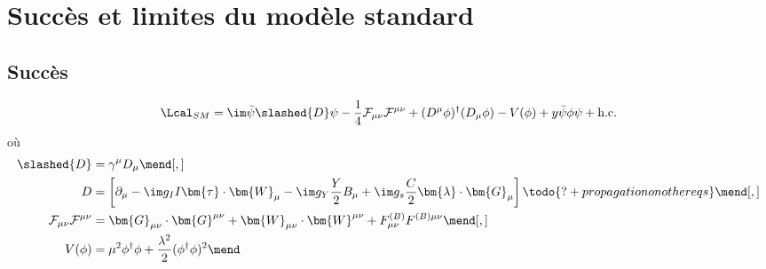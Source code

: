 \section{Succès et limites du modèle standard}\label{chapter-MS-MSSM-section-succes_limites}
\subsection{Succès}\label{chapter-MS-MSSM-section-succes_limites-subsec-succes}

\begin{equation}
\Lcal_{SM} = 
\im \bar{\psi} \slashed{D} \psi
- \frac{1}{4} \mathcal{F}_{\mu\nu}\mathcal{F}^{\mu\nu}
+ (D^\mu\phi)^\dagger(D_\mu\phi) - V(\phi)
+ y \bar{\psi}\phi\psi + \text{h.c.}
\end{equation}
où
\begin{align}
\slashed{D} &= \gamma^\mu D_\mu
\mend[,]\\
D &= \left[ \partial_\mu - \im g_I I \bm{\tau}\cdot\bm{W}_\mu - \im g_Y \frac{Y}{2} B_\mu + \im g_s \frac{C}{2} \bm{\lambda}\cdot\bm{G}_\mu \right]
\todo{?+propagation on other eqs}
\mend[,]\\
\mathcal{F}_{\mu\nu}\mathcal{F}^{\mu\nu} &= \bm{G}_{\mu\nu} \cdot \bm{G}^{\mu\nu} + \bm{W}_{\mu\nu} \cdot \bm{W}^{\mu\nu} + F^{(B)}_{\mu\nu} F^{(B)\mu\nu}
\mend[,]\\
V(\phi) &= \mu^2\phi^\dagger\phi + \frac{\lambda^2}{2} (\phi^\dagger\phi)^2
\mend
\end{align}

